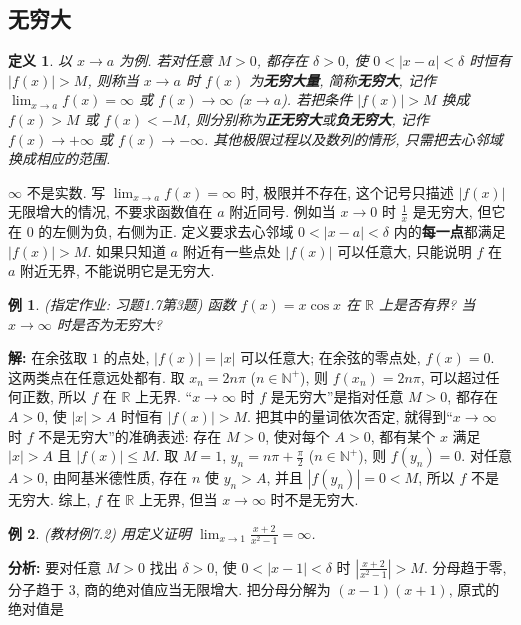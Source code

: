 \documentclass[UTF8,openany]{ctexbook}
\theoremstyle{chinesetextbook}
\newtheorem{definition}{定义}[section]
\newtheorem{example}{例}[section]
\newenvironment{cnsolution}{\par\indent\textbf{解:} \ignorespaces}{\par}
\begin{document}
\subsection{无穷大}
\begin{definition}
以 $x\to a$ 为例. 若对任意 $M>0$, 都存在 $\delta>0$, 使 $0<|x-a|<\delta$ 时恒有 $|f(x)|>M$, 则称当 $x\to a$ 时 $f(x)$ 为\textbf{无穷大量}, 简称\textbf{无穷大}, 记作 $\displaystyle\lim_{x\to a}f(x)=\infty$ 或 $f(x)\to\infty$ ($x\to a$). 若把条件 $|f(x)|>M$ 换成 $f(x)>M$ 或 $f(x)<-M$, 则分别称为\textbf{正无穷大}或\textbf{负无穷大}, 记作 $f(x)\to+\infty$ 或 $f(x)\to-\infty$. 其他极限过程以及数列的情形, 只需把去心邻域换成相应的范围.
\end{definition}
$\infty$ 不是实数. 写 $\displaystyle\lim_{x\to a}f(x)=\infty$ 时, 极限并不存在, 这个记号只描述 $|f(x)|$ 无限增大的情况, 不要求函数值在 $a$ 附近同号. 例如当 $x\to0$ 时 $\displaystyle\frac1x$ 是无穷大, 但它在 $0$ 的左侧为负, 右侧为正. 定义要求去心邻域 $0<|x-a|<\delta$ 内的\textbf{每一点}都满足 $|f(x)|>M$. 如果只知道 $a$ 附近有一些点处 $|f(x)|$ 可以任意大, 只能说明 $f$ 在 $a$ 附近无界, 不能说明它是无穷大.
\begin{example}
\textnormal{(指定作业: 习题1.7第3题)} 函数 $f(x)=x\cos x$ 在 $\mathbb R$ 上是否有界? 当 $x\to\infty$ 时是否为无穷大?
\end{example}
\begin{cnsolution}
在余弦取 $1$ 的点处, $|f(x)|=|x|$ 可以任意大; 在余弦的零点处, $f(x)=0$. 这两类点在任意远处都有. 取 $x_n=2n\pi$ ($n\in\mathbb N^+$), 则 $f(x_n)=2n\pi$, 可以超过任何正数, 所以 $f$ 在 $\mathbb R$ 上无界. “$x\to\infty$ 时 $f$ 是无穷大”是指对任意 $M>0$, 都存在 $A>0$, 使 $|x|>A$ 时恒有 $|f(x)|>M$. 把其中的量词依次否定, 就得到“$x\to\infty$ 时 $f$ 不是无穷大”的准确表述: 存在 $M>0$, 使对每个 $A>0$, 都有某个 $x$ 满足 $|x|>A$ 且 $|f(x)|\le M$. 取 $M=1$, $\displaystyle y_n=n\pi+\frac\pi2$ ($n\in\mathbb N^+$), 则 $f(y_n)=0$. 对任意 $A>0$, 由阿基米德性质, 存在 $n$ 使 $y_n>A$, 并且 $|f(y_n)|=0<M$, 所以 $f$ 不是无穷大. 综上, $f$ 在 $\mathbb R$ 上无界, 但当 $x\to\infty$ 时不是无穷大.
\end{cnsolution}
\begin{example}
\textnormal{(教材例7.2)} 用定义证明 $\displaystyle\lim_{x\to1}\frac{x+2}{x^2-1}=\infty$.
\end{example}
\par\indent\textbf{分析:} 要对任意 $M>0$ 找出 $\delta>0$, 使 $0<|x-1|<\delta$ 时 $\displaystyle\left|\frac{x+2}{x^2-1}\right|>M$. 分母趋于零, 分子趋于 $3$, 商的绝对值应当无限增大. 把分母分解为 $(x-1)(x+1)$, 原式的绝对值是
\end{document}
